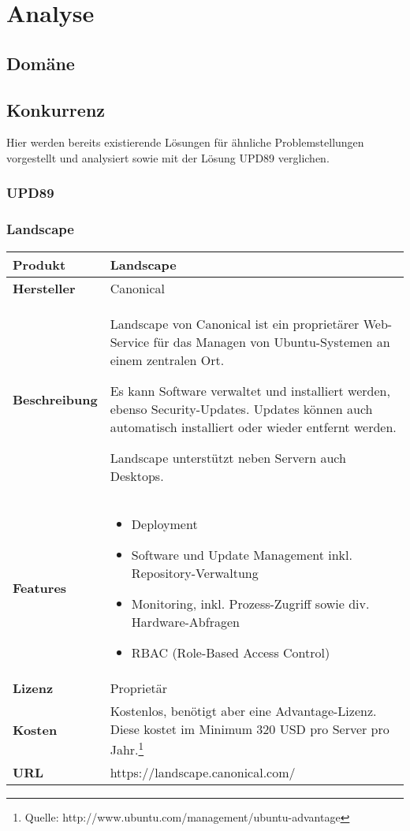 \chapter{Analyse}

\section{Domäne}

\section{Konkurrenz} \label{sec:analysis:competition}

Hier werden bereits existierende Lösungen für ähnliche Problemstellungen vorgestellt und analysiert sowie mit der Lösung \gls{UPD89} verglichen.

\subsection{UPD89}

\newcommand{\competitor}[7]{
	\begin{tabularx}{\linewidth}{lX}
		\toprule
		\textbf{Produkt} & #1\\
		\midrule
		\textbf{Hersteller} & #2\\
		\textbf{Beschreibung} & #3\\
		\textbf{Features} & #4\\
    \textbf{Lizenz} & #5\\
		\textbf{Kosten} & #6\\
    \textbf{URL} & #7\\
		\bottomrule
	\end{tabularx}
}

\subsection{Landscape}

\competitor{Landscape}
{Canonical}
{Landscape von Canonical ist ein proprietärer Web-Service für das Managen von Ubuntu-Systemen an einem zentralen Ort.

Es kann Software verwaltet und installiert werden, ebenso Security-Updates. Updates können auch automatisch installiert oder wieder entfernt werden.

Landscape unterstützt neben Servern auch Desktops.}
{\begin{itemize}
\item Deployment
\item Software und Update Management inkl. Repository-Verwaltung
\item Monitoring, inkl. Prozess-Zugriff sowie div. Hardware-Abfragen
\item RBAC (Role-Based Access Control)
\end{itemize}}
{Proprietär}
{Kostenlos, benötigt aber eine Advantage-Lizenz. Diese kostet im Minimum 320 USD pro Server pro Jahr.\footnote{Quelle: http://www.ubuntu.com/management/ubuntu-advantage}}
{https://landscape.canonical.com/}

